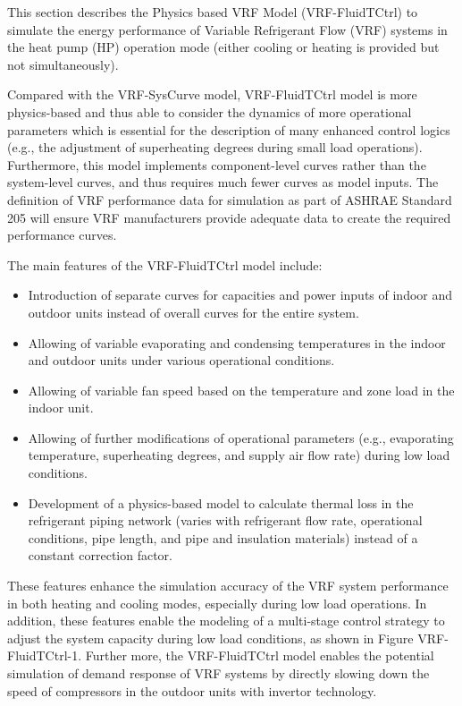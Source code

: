 This section describes the Physics based VRF Model (VRF-FluidTCtrl) to simulate the energy performance of Variable Refrigerant Flow (VRF) systems in the heat pump (HP) operation mode (either cooling or heating is provided but not simultaneously). 

Compared with the VRF-SysCurve model, VRF-FluidTCtrl model is more physics-based and thus able to consider the dynamics of more operational parameters which is essential for the description of many enhanced control logics (e.g., the adjustment of superheating degrees during small load operations). Furthermore, this model implements component-level curves rather than the system-level curves, and thus requires much fewer curves as model inputs. The definition of VRF performance data for simulation as part of ASHRAE Standard 205 will ensure VRF manufacturers provide adequate data to create the required performance curves.

The main features of the VRF-FluidTCtrl model include:

\begin{itemize}
  \item
    Introduction of separate curves for capacities and power inputs of indoor and outdoor units instead of overall curves for the entire system.
 \item
   Allowing of variable evaporating and condensing temperatures in the indoor and outdoor units under various operational conditions.
\item
  Allowing of variable fan speed based on the temperature and zone load in the indoor unit.
\item
  Allowing of further modifications of operational parameters (e.g., evaporating temperature, superheating degrees, and supply air flow rate) during low load conditions.
\item
  Development of a physics-based model to calculate thermal loss in the refrigerant piping network (varies with refrigerant flow rate, operational conditions, pipe length, and pipe and insulation materials) instead of a constant correction factor.
\end{itemize}

These features enhance the simulation accuracy of the VRF system performance in both heating and cooling modes, especially during low load operations. In addition, these features enable the modeling of a multi-stage control strategy to adjust the system capacity during low load conditions, as shown in Figure VRF-FluidTCtrl-1. Further more, the VRF-FluidTCtrl model enables the potential simulation of demand response of VRF systems by directly slowing down the speed of compressors in the outdoor units with invertor technology.

